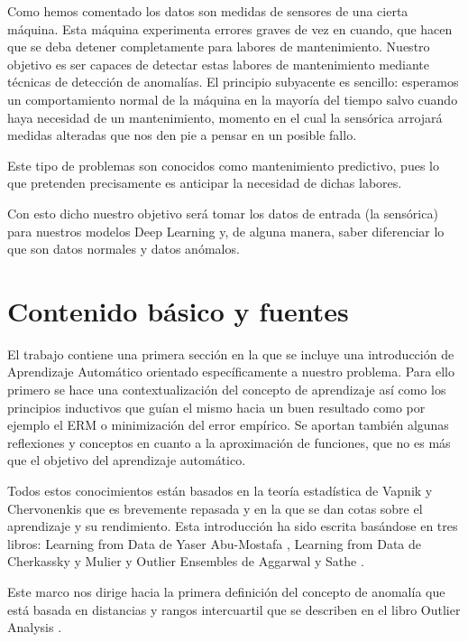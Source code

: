 Como hemos comentado los datos son medidas de sensores de una cierta máquina. Esta máquina experimenta errores graves de vez en cuando, que hacen que se deba detener completamente para labores de mantenimiento. Nuestro objetivo es ser capaces de detectar estas labores de mantenimiento mediante técnicas de detección de anomalías. El principio subyacente es sencillo: esperamos un comportamiento normal de la máquina en la mayoría del tiempo salvo cuando haya necesidad de un mantenimiento, momento en el cual la sensórica arrojará medidas alteradas que nos den pie a pensar en un posible fallo.

Este tipo de problemas son conocidos como mantenimiento predictivo, pues lo que pretenden precisamente es anticipar la necesidad de dichas labores.

Con esto dicho nuestro objetivo será tomar los datos de entrada (la sensórica) para nuestros modelos Deep Learning y, de alguna manera, saber diferenciar lo que son datos normales y datos anómalos.

\section{Contenido básico y fuentes}


El trabajo contiene una primera sección en la que se incluye una introducción de Aprendizaje Automático orientado específicamente a nuestro problema. Para ello primero se hace una contextualización del concepto de aprendizaje así como los principios inductivos que guían el mismo hacia un buen resultado como por ejemplo el ERM o minimización del error empírico. Se aportan también algunas reflexiones y conceptos en cuanto a la aproximación de funciones, que no es más que el objetivo del aprendizaje automático. 

Todos estos conocimientos están basados en la teoría estadística de Vapnik y Chervonenkis que es brevemente repasada y en la que se dan cotas sobre el aprendizaje y su rendimiento. Esta introducción ha sido escrita basándose en tres libros: Learning from Data de Yaser Abu-Mostafa \cite{yaser_learning_2012}, Learning from Data de Cherkassky y Mulier \cite{cherkassky_learning_2007}  y Outlier Ensembles de Aggarwal y Sathe \cite{aggarwal_outlier_2017}.

Este marco nos dirige hacia la primera definición del concepto de anomalía que está basada en distancias y rangos intercuartil que se describen en el libro Outlier Analysis \cite{aggarwal_outlier_2017-1}.

